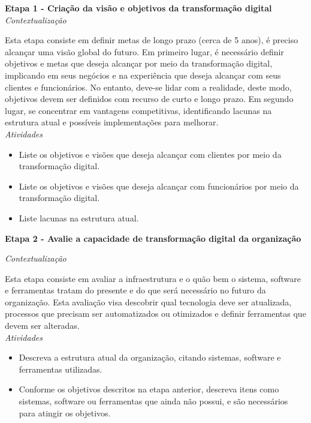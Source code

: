 \textbf{Etapa 1 - Criação da visão e objetivos da transformação digital}\\

\textit{Contextualização}

Esta etapa consiste em definir metas de longo prazo (cerca de 5 anos), é preciso alcançar uma visão global do futuro.
Em primeiro lugar, é necessário definir objetivos e metas que deseja alcançar por meio da transformação digital, implicando em seus negócios e na experiência que deseja alcançar com seus clientes e funcionários. No entanto, deve-se lidar com a realidade, deste modo, objetivos devem ser definidos com recurso de curto e longo prazo. Em segundo lugar, se concentrar em vantagens competitivas, identificando lacunas na estrutura atual e possíveis implementações para melhorar.\\

\textit{Atividades}
\begin{itemize}
    \item Liste os objetivos e visões que deseja alcançar com clientes por meio da transformação digital.
    
    \item Liste os objetivos e visões que deseja alcançar com funcionários por meio da transformação digital.
    
    \item Liste lacunas na estrutura atual.
\end{itemize}


\textbf{Etapa 2 - Avalie a capacidade de transformação digital da organização}

\textit{Contextualização}

Esta etapa consiste em avaliar a infraestrutura e o quão bem o sistema, software e ferramentas tratam do presente e do que será necessário no futuro da organização. Esta avaliação visa descobrir qual tecnologia deve ser atualizada, processos que precisam ser automatizados ou otimizados e definir ferramentas que devem ser alteradas.\\

\textit{Atividades}
\begin{itemize}
    \item Descreva a estrutura atual da organização, citando sistemas, software e ferramentas utilizadas.

    \item Conforme os objetivos descritos na etapa anterior, descreva itens como sistemas, software ou ferramentas que ainda não possui, e são necessários para atingir os objetivos.
\end{itemize}

